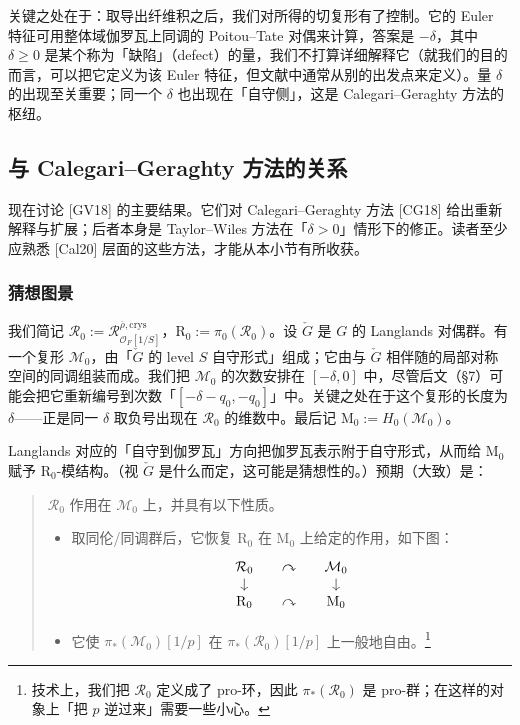 关键之处在于：取导出纤维积之后，我们对所得的切复形有了控制。它的 Euler 特征可用整体域伽罗瓦上同调的 Poitou--Tate 对偶来计算，答案是 $-\delta$，其中 $\delta\ge0$ 是某个称为「缺陷」（defect）的量，我们不打算详细解释它（就我们的目的而言，可以把它定义为该 Euler 特征，但文献中通常从别的出发点来定义）。量 $\delta$ 的出现至关重要；同一个 $\delta$ 也出现在「自守侧」，这是 Calegari--Geraghty 方法的枢纽。

\subsection{与 Calegari--Geraghty 方法的关系}

现在讨论 [GV18] 的主要结果。它们对 Calegari--Geraghty 方法 [CG18] 给出重新解释与扩展；后者本身是 Taylor--Wiles 方法在「$\delta>0$」情形下的修正。读者至少应熟悉 [Cal20] 层面的这些方法，才能从本小节有所收获。

\subsubsection{猜想图景}

我们简记 $\mathcal R_0:=\mathcal R^{\overline\rho,\mathrm{crys}}_{\mathcal O_F[1/S]}$，$\mathrm R_0:=\pi_0(\mathcal R_0)$。设 $\check G$ 是 $G$ 的 Langlands 对偶群。有一个复形 $\mathcal M_0$，由「$\check G$ 的 level $S$ 自守形式」组成；它由与 $\check G$ 相伴随的局部对称空间的同调组装而成。我们把 $\mathcal M_0$ 的次数安排在 $[-\delta,0]$ 中，尽管后文（§7）可能会把它重新编号到次数「$[-\delta-q_0,-q_0]$」中。关键之处在于这个复形的长度为 $\delta$——正是同一 $\delta$ 取负号出现在 $\mathcal R_0$ 的维数中。最后记 $\mathrm M_0:=H_0(\mathcal M_0)$。

Langlands 对应的「自守到伽罗瓦」方向把伽罗瓦表示附于自守形式，从而给 $\mathrm M_0$ 赋予 $\mathrm R_0$-模结构。（视 $\check G$ 是什么而定，这可能是猜想性的。）预期（大致）是：

\begin{quote}
$\mathcal R_0$ 作用在 $\mathcal M_0$ 上，并具有以下性质。
\begin{itemize}[leftmargin=1.4em]
\item 取同伦/同调群后，它恢复 $\mathrm R_0$ 在 $\mathrm M_0$ 上给定的作用，如下图：
\[
\begin{tikzcd}[column sep=small, row sep=small]
\mathcal R_0\arrow[d] & \curvearrowright & \mathcal M_0\arrow[d]\\
\mathrm R_0 & \curvearrowright & \mathrm M_0
\end{tikzcd}
\]
\item 它使 $\pi_*(\mathcal M_0)[1/p]$ 在 $\pi_*(\mathcal R_0)[1/p]$ 上一般地自由。\footnote{技术上，我们把 $\mathcal R_0$ 定义成了 pro-环，因此 $\pi_*(\mathcal R_0)$ 是 pro-群；在这样的对象上「把 $p$ 逆过来」需要一些小心。}
\end{itemize}
\end{quote}

